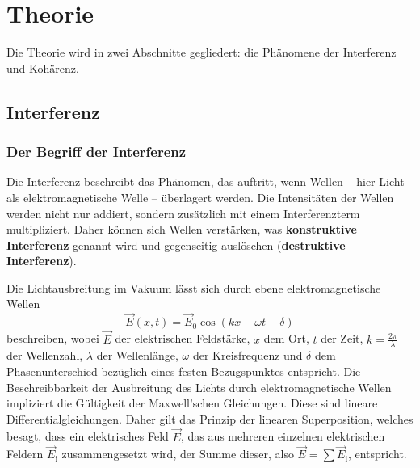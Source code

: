 \section{Theorie}
\label{sec:Theorie}

Die Theorie wird in zwei Abschnitte gegliedert: die Phänomene der Interferenz und Kohärenz.


\subsection{Interferenz}
\label{sec:interferenz}

\subsubsection{Der Begriff der Interferenz}
\label{sec:interferenzdef}
Die Interferenz beschreibt das Phänomen, das auftritt, wenn Wellen -- hier Licht als 
elektromagnetische Welle -- überlagert werden. 
Die Intensitäten der Wellen werden nicht nur addiert, sondern zusätzlich mit einem
Interferenzterm multipliziert. Daher können sich Wellen verstärken, was \textbf{konstruktive 
Interferenz} genannt wird und gegenseitig auslöschen (\textbf{destruktive Interferenz}).

Die Lichtausbreitung im Vakuum lässt sich durch ebene elektromagnetische Wellen
\begin{equation}
	\label{eqn:ebenewelle}
	\vec{E}(x,t) = \vec{E}_0 \cos(k x - \omega t - \delta) 
\end{equation}
beschreiben, wobei $\vec{E}$ der elektrischen Feldstärke, $x$ dem Ort, $t$ der Zeit, $k=\frac{2\pi}{\lambda}$ der Wellenzahl, $\lambda$
der Wellenlänge, $\omega$ der Kreisfrequenz und $\delta$ dem Phasenunterschied bezüglich eines 
festen Bezugspunktes entspricht.
Die Beschreibbarkeit der Ausbreitung des Lichts durch elektromagnetische Wellen impliziert die 
Gültigkeit der Maxwell'schen Gleichungen. Diese sind lineare Differentialgleichungen. Daher 
gilt das Prinzip der linearen Superposition, welches besagt, dass ein elektrisches Feld
$\vec{E}$, das aus mehreren einzelnen elektrischen Feldern $\vec{E}_{\mathrm{i}}$
zusammengesetzt wird, der Summe dieser, also $\vec{E} = \sum \vec{E}_{\mathrm{i}}$, entspricht.


